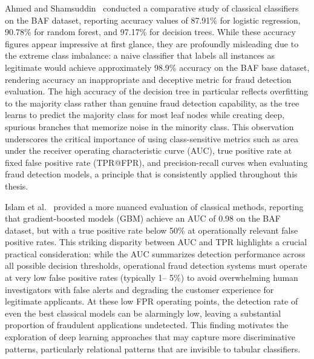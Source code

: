 Ahmed and Shamsuddin~\cite{ahmed2022comparative} conducted a comparative study
of classical classifiers on the BAF dataset, reporting accuracy values of
87.91\% for logistic regression, 90.78\% for random forest, and 97.17\% for
decision trees. While these accuracy figures appear impressive at first glance,
they are profoundly misleading due to the extreme class imbalance: a naive
classifier that labels all instances as legitimate would achieve approximately
98.9\% accuracy on the BAF base dataset, rendering accuracy an inappropriate and
deceptive metric for fraud detection evaluation. The high accuracy of the
decision tree in particular reflects overfitting to the majority class rather
than genuine fraud detection capability, as the tree learns to predict the
majority class for most leaf nodes while creating deep, spurious branches that
memorize noise in the minority class. This observation underscores the critical
importance of using class-sensitive metrics such as area under the receiver
operating characteristic curve (AUC), true positive rate at fixed false positive
rate (TPR@FPR), and precision-recall curves when evaluating fraud detection
models, a principle that is consistently applied throughout this thesis.

Islam et al.~\cite{islam2023effects} provided a more nuanced evaluation of
classical methods, reporting that gradient-boosted models (GBM) achieve an AUC
of 0.98 on the BAF dataset, but with a true positive rate below 50\% at
operationally relevant false positive rates. This striking disparity between AUC
and TPR highlights a crucial practical consideration: while the AUC summarizes
detection performance across all possible decision thresholds, operational fraud
detection systems must operate at very low false positive rates (typically 1--
5\%) to avoid overwhelming human investigators with false alerts and degrading
the customer experience for legitimate applicants. At these low FPR operating
points, the detection rate of even the best classical models can be alarmingly
low, leaving a substantial proportion of fraudulent applications undetected.
This finding motivates the exploration of deep learning approaches that may
capture more discriminative patterns, particularly relational patterns that are
invisible to tabular classifiers.

